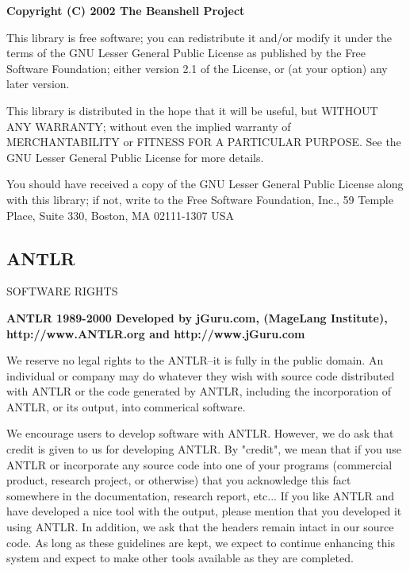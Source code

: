 \small

{\center \textbf{\textsf{Copyright (C) 2002 The Beanshell Project}}\\}

\bigskip

This library is free software; you can redistribute it and/or
modify it under the terms of the GNU Lesser General Public
License as published by the Free Software Foundation; either
version 2.1 of the License, or (at your option) any later version.

This library is distributed in the hope that it will be useful,
but WITHOUT ANY WARRANTY; without even the implied warranty of
MERCHANTABILITY or FITNESS FOR A PARTICULAR PURPOSE.  See the GNU
Lesser General Public License for more details.

You should have received a copy of the GNU Lesser General Public
License along with this library; if not, write to the Free Software
Foundation, Inc., 59 Temple Place, Suite 330, Boston, MA  02111-1307  USA

\normalsize

\subsection{ANTLR}

\small

SOFTWARE RIGHTS

{\center \textbf{\textsf{ANTLR 1989-2000 Developed by jGuru.com,
(MageLang Institute), \\ 
http://www.ANTLR.org  and http://www.jGuru.com}}\\}

\bigskip

We reserve no legal rights to the ANTLR--it is fully in the
public domain. An individual or company may do whatever
they wish with source code distributed with ANTLR or the
code generated by ANTLR, including the incorporation of
ANTLR, or its output, into commerical software.

We encourage users to develop software with ANTLR. However,
we do ask that credit is given to us for developing
ANTLR. By "credit", we mean that if you use ANTLR or
incorporate any source code into one of your programs
(commercial product, research project, or otherwise) that
you acknowledge this fact somewhere in the documentation,
research report, etc... If you like ANTLR and have
developed a nice tool with the output, please mention that
you developed it using ANTLR. In addition, we ask that the
headers remain intact in our source code. As long as these
guidelines are kept, we expect to continue enhancing this
system and expect to make other tools available as they are
completed.

\normalsize
